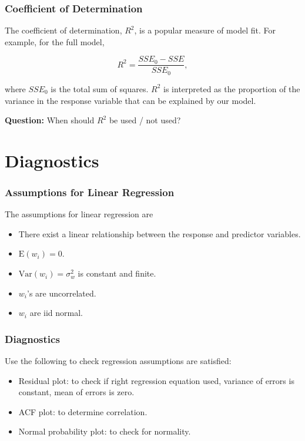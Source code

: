 \documentclass[%
xcolor=pdftex]{beamer}
\begin{document}
\begin{frame}
\frametitle{Coefficient of Determination}

The coefficient of determination, $R^2$, is a popular measure of model fit. For example, for the full model,

\begin{equation}
R^2 = \frac{SSE_0 - SSE}{SSE_0},
\end{equation}

where $SSE_0$ is the total sum of squares. $R^2$ is interpreted as the proportion of the variance in the response variable that can be explained by our model. \\

\vspace{5mm}

\textbf{Question:} When should $R^2$ be used / not used?

\end{frame}

\section{Diagnostics}
\frame{\tableofcontents[currentsection]}

\begin{frame}
\frametitle{Assumptions for Linear Regression}

The assumptions for linear regression are

\begin{itemize}
\item There exist a linear relationship between the response and predictor variables.
\item $\mbox{E}(w_i) = 0$.
\item $\mbox{Var}(w_i) = \sigma_w^2$ is constant and finite.
\item $w_i$'s are uncorrelated.
\item $w_i$ are iid normal.
\end{itemize}

\end{frame}

\begin{frame}
\frametitle{Diagnostics}

Use the following to check regression assumptions are satisfied:

\begin{itemize}
\item Residual plot: to check if right regression equation used, variance of errors is constant, mean of errors is zero.
\item ACF plot: to determine correlation.
\item Normal probability plot: to check for normality.
\end{itemize}

\end{frame}
\end{document}
